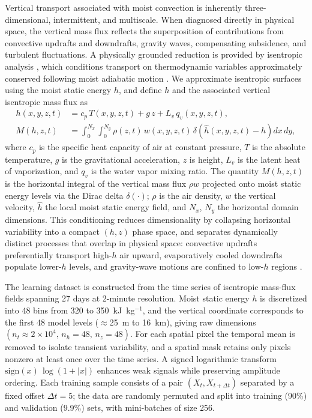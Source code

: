 \documentclass[11pt]{article}
\begin{document}
Vertical transport associated with moist convection is inherently three-dimensional, intermittent, and multiscale. When diagnosed directly in physical space, the vertical mass flux reflects the superposition of contributions from convective updrafts and downdrafts, gravity waves, compensating subsidence, and turbulent fluctuations. A physically grounded reduction is provided by isentropic analysis \cite{pauluis2013isentropic}, which conditions transport on thermodynamic variables approximately conserved following moist adiabatic motion \cite{chen2022crucial}. We approximate isentropic surfaces using the moist static energy $h$, and define $h$ and the associated vertical isentropic mass flux as
\begin{align}
    h(x,y,z,t) & = c_p\, T(x,y,z,t)+ g\, z + L_v\, q_v(x,y,z,t),\\
    M(h,z,t) &= \int_{0}^{N_x}\!\!\int_{0}^{N_y} \rho(z,t)\,w(x,y,z,t)\,
    \delta\!\left(\hat{h}(x,y,z,t)-h\right)dx\,dy,
\end{align}
where $c_p$ is the specific heat capacity of air at constant pressure, $T$ is the absolute temperature, $g$ is the gravitational acceleration, $z$ is height, $L_v$ is the latent heat of vaporization, and $q_v$ is the water vapor mixing ratio. The quantity $M(h,z,t)$ is the horizontal integral of the vertical mass flux $\rho w$ projected onto moist static energy levels via the Dirac delta $\delta(\cdot)$; $\rho$ is the air density, $w$ the vertical velocity, $\hat{h}$ the local moist static energy field, and $N_x$, $N_y$ the horizontal domain dimensions. This conditioning reduces dimensionality by collapsing horizontal variability into a compact $(h,z)$ phase space, and separates dynamically distinct processes that overlap in physical space: convective updrafts preferentially transport high-$h$ air upward, evaporatively cooled downdrafts populate lower-$h$ levels, and gravity-wave motions are confined to low-$h$ regions \cite{chen2018atmospheric, chen2020significant, mrowiec2016isentropic}.

The learning dataset is constructed from the time series of isentropic mass-flux fields spanning 27 days at 2-minute resolution. Moist static energy $h$ is discretized into 48 bins from 320 to 350~kJ~kg$^{-1}$, and the vertical coordinate corresponds to the first 48 model levels ($\approx$25~m to 16~km), giving raw dimensions $(n_t \approx 2\times10^{4},\, n_h=48,\, n_z=48)$. For each spatial pixel the temporal mean is removed to isolate transient variability, and a spatial mask retains only pixels nonzero at least once over the time series. A signed logarithmic transform $\mathrm{sign}(x)\,\log(1+|x|)$ enhances weak signals while preserving amplitude ordering. Each training sample consists of a pair $(X_t, X_{t+\Delta t})$ separated by a fixed offset $\Delta t = 5$; the data are randomly permuted and split into training (90\%) and validation (9.9\%) sets, with mini-batches of size 256.
\end{document}
